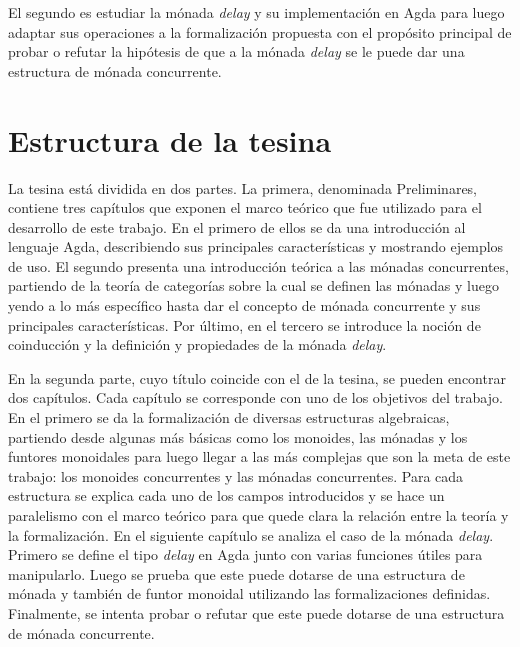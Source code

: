 El segundo es estudiar la mónada \textit{delay} y su implementación en Agda para luego adaptar sus operaciones a la formalización propuesta con el propósito principal de probar o refutar la hipótesis de que a la mónada \textit{delay} se le puede dar una estructura de mónada concurrente.

\section{Estructura de la tesina}

La tesina está dividida en dos partes. La primera, denominada Preliminares, contiene tres capítulos que exponen el marco teórico que fue utilizado para el desarrollo de este trabajo. En el primero de ellos se da una introducción al lenguaje Agda, describiendo sus principales características y mostrando ejemplos de uso. El segundo presenta una introducción teórica a las mónadas concurrentes, partiendo de la teoría de categorías sobre la cual se definen las mónadas y luego yendo a lo más específico hasta dar el concepto de mónada concurrente y sus principales características. Por último, en el tercero se introduce la noción de coinducción y la definición y propiedades de la mónada \textit{delay}. 

En la segunda parte, cuyo título coincide con el de la tesina, se pueden encontrar dos capítulos. Cada capítulo se corresponde con uno de los objetivos del trabajo. En el primero se da la formalización de diversas estructuras algebraicas, partiendo desde algunas más básicas como los monoides, las mónadas y los funtores monoidales para luego llegar a las más complejas que son la meta de este trabajo: los monoides concurrentes y las mónadas concurrentes. Para cada estructura se explica cada uno de los campos introducidos y se hace un paralelismo con el marco teórico para que quede clara la relación entre la teoría y la formalización. En el siguiente capítulo se analiza el caso de la mónada \textit{delay}. Primero se define el tipo \textit{delay} en Agda junto con varias funciones útiles para manipularlo. Luego se prueba que este puede dotarse de una estructura de mónada y también de funtor monoidal utilizando las formalizaciones definidas. Finalmente, se intenta probar o refutar que este puede dotarse de una estructura de mónada concurrente.